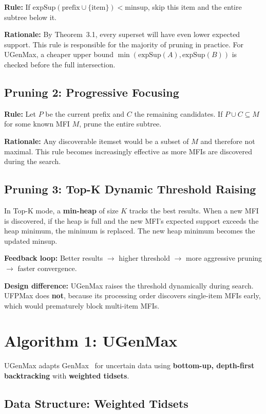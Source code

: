 \documentclass[12pt,a4paper]{report}
\begin{document}
  \textbf{Rule:} If $\text{expSup}(\text{prefix} \cup \{\text{item}\}) < \text{minsup}$, skip this item and the entire subtree below it.

  \textbf{Rationale:} By Theorem~3.1, every superset will have even lower expected support. This rule is responsible for the majority of pruning in practice. For UGenMax, a cheaper upper bound $\min(\text{expSup}(A), \text{expSup}(B))$ is checked before the full intersection.

  \subsection{Pruning 2: Progressive Focusing}

  \textbf{Rule:} Let $P$ be the current prefix and $C$ the remaining candidates. If $P \cup C \subseteq M$ for some known MFI $M$, prune the entire subtree.

  \textbf{Rationale:} Any discoverable itemset would be a subset of $M$ and therefore not maximal. This rule becomes increasingly effective as more MFIs are discovered during the search.

  \subsection{Pruning 3: Top-K Dynamic Threshold Raising}

  In Top-K mode, a \textbf{min-heap} of size $K$ tracks the best results. When a new MFI is discovered, if the heap is full and the new MFI's expected support exceeds the heap minimum, the minimum is replaced. The new heap minimum becomes the updated minsup.

  \textbf{Feedback loop:} Better results $\rightarrow$ higher threshold $\rightarrow$ more aggressive pruning $\rightarrow$ faster convergence.

  \textbf{Design difference:} UGenMax raises the threshold dynamically during search. UFPMax does \textbf{not}, because its processing order discovers single-item MFIs early, which would prematurely block multi-item MFIs.

  \section{Algorithm 1: UGenMax}

  UGenMax adapts GenMax~\cite{gouda2005} for uncertain data using \textbf{bottom-up, depth-first backtracking} with \textbf{weighted tidsets}.

  \subsection{Data Structure: Weighted Tidsets}
\end{document}
